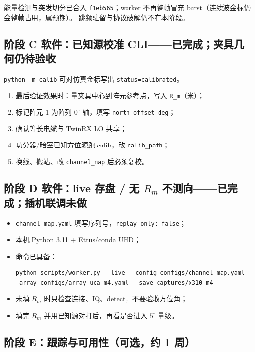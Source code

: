 \documentclass[UTF8,a4paper,12pt,zihao=-4]{ctexart}
\newcommand{\done}[1]{\textcolor{doneC}{#1}}
\newcommand{\pend}[1]{\textcolor{pendC}{#1}}
\newcommand{\remind}[1]{\textcolor{remindC}{#1}}
\begin{document}
\done{能量检测与突发切分已合入 \texttt{f1eb565}；worker 不再整帧冒充 burst（连续波金标仍会整帧占用，属预期）。}
跳频驻留与协议破解仍不在本阶段。

\subsection{\done{阶段 C 软件：已知源校准 CLI——已完成}；\remind{夹具几何仍待验收}}

\done{\texttt{python -m calib} 可对仿真金标写出 \texttt{status=calibrated}。}
\begin{enumerate}[leftmargin=2em]
  \item \remind{最后验证效果时：量夹具中心到阵元参考点，写入 \texttt{R\_m}（米）；}
  \item \pend{标记阵元 1 为阵列 $0^\circ$ 轴，填写 \texttt{north\_offset\_deg}；}
  \item \pend{确认等长电缆与 TwinRX LO 共享；}
  \item \pend{功分器/暗室已知方位源跑 calib，改 \texttt{calib\_path}；}
  \item 换线、搬站、改 \texttt{channel\_map} 后必须复校。
\end{enumerate}

\subsection{\done{阶段 D 软件：live 存盘 / 无 $R_m$ 不测向——已完成}；\pend{插机联调未做}}

\begin{itemize}[leftmargin=2em]
  \item \pend{\texttt{channel\_map.yaml} 填写序列号，\texttt{replay\_only: false}；}
  \item \pend{本机 Python 3.11 + Ettus/conda UHD；}
  \item \done{命令已具备：}
\begin{lstlisting}
python scripts/worker.py --live --config configs/channel_map.yaml --array configs/array_uca_m4.yaml --save captures/x310_m4
\end{lstlisting}
  \item \remind{未填 $R_m$ 时只检查连接、IQ、detect，不要验收方位角；}
  \item \pend{填完 $R_m$ 并用已知源对打后，再看是否进入 $5^\circ$ 量级。}
\end{itemize}

\subsection{阶段 E：跟踪与可用性（可选，约 1 周）}
\end{document}
